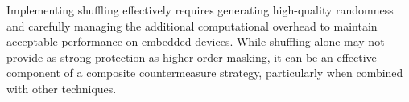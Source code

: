 Implementing shuffling effectively requires generating high-quality randomness and carefully managing the additional computational overhead to maintain acceptable performance on embedded devices. While shuffling alone may not provide as strong protection as higher-order masking, it can be an effective component of a composite countermeasure strategy, particularly when combined with other techniques.

